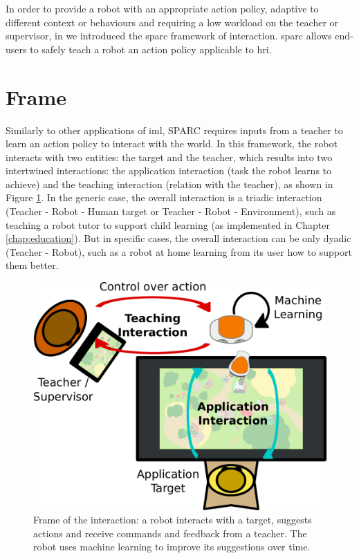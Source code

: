 In order to provide a robot with an appropriate action policy, adaptive to different context or behaviours and requiring a low workload on the teacher or supervisor, in \cite{senft2015sparc} we introduced the \gls{sparc} framework of interaction. \gls{sparc} allows end-users to safely teach a robot an action policy applicable to \gls{hri}.
\section{Frame}

Similarly to other applications of \gls{iml}, SPARC requires inputs from a teacher to learn an action policy to interact with the world. In this framework, the robot interacts with two entities: the target and the teacher, which results into two intertwined interactions: the application interaction (task the robot learns to achieve) and the teaching interaction (relation with the teacher), as shown in Figure \ref{fig:frame}. In the generic case, the overall interaction is a triadic interaction (Teacher - Robot - Human target or Teacher - Robot - Environment), such as teaching a robot tutor to support child learning (as implemented in Chapter \ref{chap:education}). But in specific cases, the overall interaction can be only dyadic (Teacher - Robot), such as a robot at home learning from its user how to support them better.

\begin{figure}[ht]
	\includegraphics[width=.8\linewidth]{setup.pdf}
	\centering
	\caption{Frame of the interaction: a robot interacts with a target, suggests actions and receive commands and feedback from a teacher. The robot uses machine learning to improve its suggestions over time.}
	\label{fig:frame}
\end{figure}

